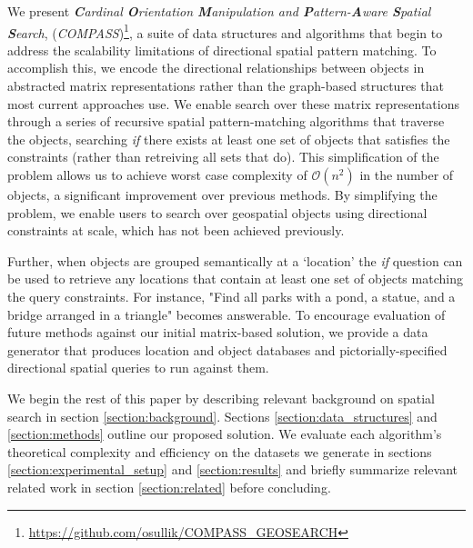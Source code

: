We present \textit{\textbf{C}ardinal \textbf{O}rientation \textbf{M}anipulation and \textbf{P}attern-\textbf{A}ware \textbf{S}patial \textbf{S}earch}, (\emph{COMPASS})\footnote{\url{https://github.com/osullik/COMPASS_GEOSEARCH}}, a suite of data structures and algorithms that begin to address the scalability limitations of directional spatial pattern matching.
To accomplish this, we encode the directional relationships between objects in abstracted matrix representations rather than the graph-based structures that most current approaches use.
We enable search over these matrix representations through a series of recursive spatial pattern-matching algorithms that traverse the objects, searching \emph{if} there exists at least one set of objects that satisfies the constraints (rather than retreiving all sets that do).
This simplification of the problem allows us to achieve worst case complexity of $\mathcal{O}(n^2)$ in the number of objects, a significant improvement over previous methods.
By simplifying the problem, we enable users to search over geospatial objects using directional constraints at scale, which has not been achieved previously.

Further, when objects are grouped semantically at a `location' the \emph{if} question can be used to retrieve any locations that contain at least one set of objects matching the query constraints.
For instance, "Find all parks with a pond, a statue, and a bridge arranged in a triangle" becomes answerable.
To encourage evaluation of future methods against our initial matrix-based solution, we provide a data generator that produces location and object databases and pictorially-specified directional spatial queries to run against them.

We begin the rest of this paper by describing relevant background on spatial search in section \ref{section:background}. Sections \ref{section:data_structures} and \ref{section:methods} outline our proposed solution. We evaluate each algorithm's theoretical complexity and efficiency on the datasets we generate in sections \ref{section:experimental_setup} and \ref{section:results} and briefly summarize relevant related work in section \ref{section:related} before concluding.